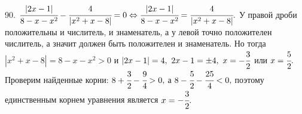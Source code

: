 90. $\cfrac{|2x-1|}{8-x-x^2}-\cfrac{4}{|x^2+x-8|}=0\Leftrightarrow\cfrac{|2x-1|}{8-x-x^2}=\cfrac{4}{|x^2+x-8|}.$ У правой дроби положительны и числитель, и знаменатель, а у левой точно положителен числитель, а значит должен быть положителен и знаменатель. Но тогда $|x^2+x-8|=8-x-x^2>0$ и $|2x-1|=4,\ 2x-1=\pm4,\ x=-\cfrac{3}{2}$ или $x=\cfrac{5}{2}.$ Проверим найденные корни: $8+\cfrac{3}{2}-\cfrac{9}{4}>0,$ а $8-\cfrac{5}{2}-\cfrac{25}{4}<0,$ поэтому единственным корнем уравнения является $x=-\cfrac{3}{2}.$\\
